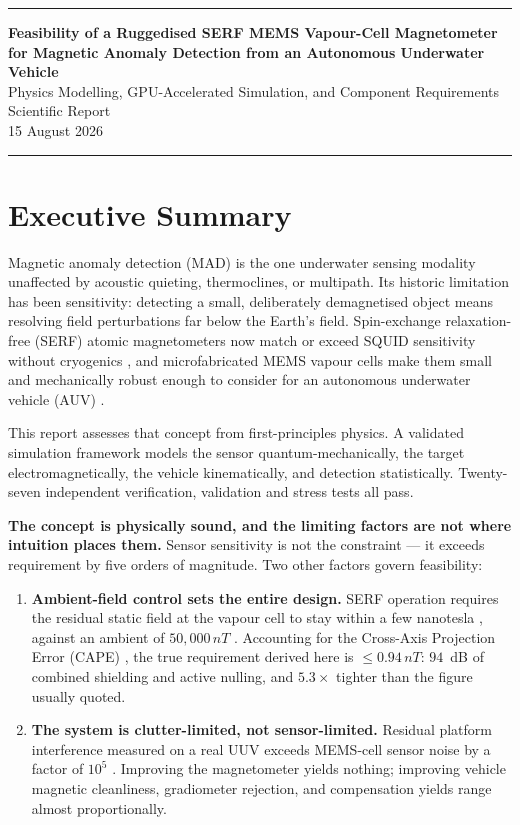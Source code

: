 \documentclass[11pt]{article}
\newcommand{\band}{\begin{center}\rule{\linewidth}{0.8pt}\end{center}}
\newcommand{\nT}{\,nT}\newcommand{\pT}{\,pT}\newcommand{\fT}{\,fT}
\begin{document}
\thispagestyle{fancy}
\band
\begin{center}
{\large\bfseries Feasibility of a Ruggedised SERF MEMS Vapour-Cell Magnetometer\\[2pt]
for Magnetic Anomaly Detection from an Autonomous Underwater Vehicle}\\[8pt]
{\normalsize Physics Modelling, GPU-Accelerated Simulation, and Component Requirements}\\[10pt]
{\small Scientific Report}\\[8pt]
{\small 15 August 2026}
\end{center}
\band
\vspace{-0.35cm}

\section*{Executive Summary}
\noindent Magnetic anomaly detection (MAD) is the one underwater sensing modality
unaffected by acoustic quieting, thermoclines, or multipath. Its historic
limitation has been sensitivity: detecting a small, deliberately demagnetised
object means resolving field perturbations far below the Earth's field.
Spin-exchange relaxation-free (SERF) atomic magnetometers now match or exceed
SQUID sensitivity without cryogenics \cite{allred2002,kominis2003,dang2010},
and microfabricated MEMS vapour cells make them small and mechanically robust
enough to consider for an autonomous underwater vehicle (AUV)
\cite{griffith2010,shah2007}.

This report assesses that concept from first-principles physics. A validated
simulation framework models the sensor quantum-mechanically, the target
electromagnetically, the vehicle kinematically, and detection statistically.
Twenty-seven independent verification, validation and stress tests all pass.

\textbf{The concept is physically sound, and the limiting factors are not where
intuition places them.} Sensor sensitivity is not the constraint --- it exceeds
requirement by five orders of magnitude. Two other factors govern feasibility:

\begin{enumerate}[leftmargin=1.5em]
\item \textbf{Ambient-field control sets the entire design.} SERF operation
requires the residual static field at the vapour cell to stay within a few
nanotesla \cite{borna2022}, against an ambient of $50{,}000\nT$
\cite{ncei}. Accounting for the Cross-Axis Projection Error (CAPE)
\cite{borna2022}, the true requirement derived here is $\leq 0.94\nT$: $94$~dB
of combined shielding and active nulling, and $5.3\times$ tighter than the
figure usually quoted.
\item \textbf{The system is clutter-limited, not sensor-limited.} Residual
platform interference measured on a real UUV exceeds MEMS-cell sensor noise by a
factor of $10^{5}$ \cite{oehler2024,griffith2010}. Improving the magnetometer
yields nothing; improving vehicle magnetic cleanliness, gradiometer rejection,
and compensation yields range almost proportionally.
\end{enumerate}
\end{document}
